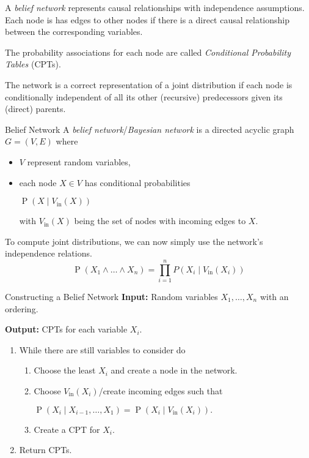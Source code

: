 \documentclass[english]{panikzettel}
\begin{document}
\begin{halfboxl}
A \emph{belief network} represents causal relationships with independence assumptions.
Each node is has edges to other nodes if there is a direct causal relationship between the corresponding variables.

The probability associations for each node are called \emph{Conditional Probability Tables} (CPTs).

The network is a correct representation of a joint distribution if each node is conditionally independent of all its other (recursive) predecessors given its (direct) parents.
\end{halfboxl}%
\begin{halfboxr}
\vspace{-\baselineskip}
\begin{defi}{Belief Network}
A \emph{belief network}/\emph{Bayesian network} is a directed acyclic graph $G = (V,E)$ where
\begin{itemize}
    \item $V$ represent random variables,
    \item each node $X \in V$ has conditional probabilities
        \begin{tightcenter}
        $\operatorname{P}(X \mid V_\mathrm{in}(X))$
        \end{tightcenter}
        with $V_\mathrm{in}(X)$ being the set of nodes with incoming edges to $X$.
\end{itemize}
\end{defi}
\end{halfboxr}

To compute joint distributions, we can now simply use the network's independence relations.
\[ \operatorname{P}(X_1 \land \ldots \land X_n) = \prod_{i=1}^n P(X_i \mid V_\mathrm{in}(X_i)) \]

\begin{algo}{Constructing a Belief Network}
\textbf{Input:} Random variables $X_1, \ldots, X_n$ with an ordering.

\textbf{Output:} CPTs for each variable $X_i$.
\tcblower
\begin{enumerate}
    \item While there are still variables to consider do
        \begin{enumerate}
            \item Choose the least $X_i$ and create a node in the network.
            \item Choose $V_\mathrm{in}(X_i)$/create incoming edges such that
                \begin{tightcenter}
                    $\operatorname{P}(X_i \mid X_{i-1}, \ldots, X_1) = \operatorname{P}(X_i \mid V_\mathrm{in}(X_i)).$
                \end{tightcenter}
            \item Create a CPT for $X_i$.
        \end{enumerate}
    \item Return CPTs.
\end{enumerate}
\end{algo}
\end{document}
